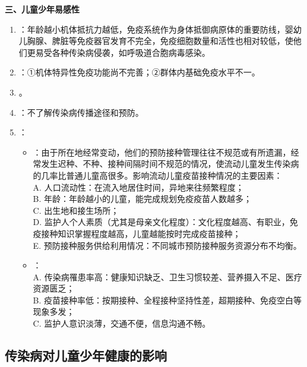 \begin{keybox}
\textbf{三、儿童少年易感性}
\begin{enumerate}[leftmargin=*]
    \item {}：年龄越小机体抵抗力越低，免疫系统作为身体抵御病原体的重要防线，婴幼儿胸腺、脾脏等免疫器官发育不完全，免疫细胞数量和活性也相对较低，使他们更易受各种传染病侵袭，如呼吸道合胞病毒感染。
    \item {}：①机体特异性免疫功能尚不完善；②群体内基础免疫水平不一。
    \item {}。
    \item {}：不了解传染病传播途径和预防。
    \item {}：
    \begin{itemize}
        \item {}：由于所在地经常变动，他们的预防接种管理往往不规范或有所遗漏，经常发生迟种、不种、接种间隔时间不规范的情况，使流动儿童发生传染病的几率比普通儿童高很多。影响流动儿童疫苗接种情况的主要因素：\\
        A. 人口流动性：在流入地居住时间，异地来往频繁程度；\\
        B. 年龄：年龄越小的儿童，能完成规划免疫疫苗人数越多；\\
        C. 出生地和接生场所；\\
        D. 监护人个人素质（尤其是母亲文化程度）：文化程度越高、有职业，免疫接种知识掌握程度越高，儿童越能按时完成疫苗接种；\\
        E. 预防接种服务供给利用情况：不同城市预防接种服务资源分布不均衡。
        \item {}：\\
        A. 传染病罹患率高：健康知识缺乏、卫生习惯较差、营养摄入不足、医疗资源匮乏；\\
        B. 疫苗接种率低：按期接种、全程接种坚持性差，超期接种、免疫空白等现象多发；\\
        C. 监护人意识淡薄，交通不便，信息沟通不畅。
    \end{itemize}
\end{enumerate}

\end{keybox}

\subsection{传染病对儿童少年健康的影响}

